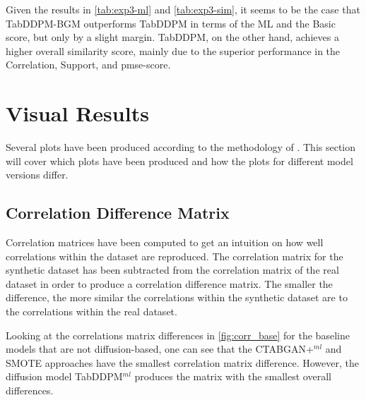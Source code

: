 Given the results in \autoref{tab:exp3-ml} and \autoref{tab:exp3-sim}, it seems to be the case that TabDDPM-BGM outperforms TabDDPM in terms of the ML and the Basic score, but only by a slight margin.
TabDDPM, on the other hand, achieves a higher overall similarity score, mainly due to the superior performance in the Correlation, Support, and \gls{pmse}-score.


\section{Visual Results}
\label{ch:results-Visual}

Several plots have been produced according to the methodology of \cite{brenninkmeijer2019GenerationEvaluationTabular}.
This section will cover which plots have been produced and how the plots for different model versions differ.

\subsection{Correlation Difference Matrix}

Correlation matrices have been computed to get an intuition on how well correlations within the dataset are reproduced.
The correlation matrix for the synthetic dataset has been subtracted from the correlation matrix of the real dataset in order to produce a correlation difference matrix.
The smaller the difference, the more similar the correlations within the synthetic dataset are to the correlations within the real dataset.

Looking at the correlations matrix differences in \autoref{fig:corr_base} for the baseline models that are not diffusion-based, one can see that the CTABGAN+$^{ml}$ and SMOTE approaches have the smallest
correlation matrix difference.
However, the diffusion model TabDDPM$^{ml}$ produces the matrix with the smallest overall differences.

